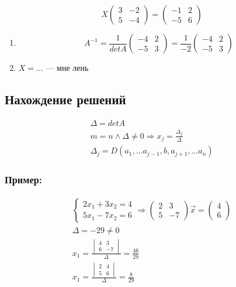 \documentclass{article}
\begin{document}
\[
X \begin{pmatrix}
	3 & -2 \\
	5 & -4
\end{pmatrix} =
\begin{pmatrix}
	-1 & 2 \\
	-5 & 6
\end{pmatrix}
\]

\begin{enumerate}
	\item \[
	A^{-1} = \frac{1}{det A} \begin{pmatrix}
		-4 & 2 \\
		-5 & 3
	\end{pmatrix} =
	\frac{1}{-2} \begin{pmatrix}
		-4 & 2 \\
		-5 & 3
	\end{pmatrix}
	\]
	\item $X = \dots$ --- мне лень
\end{enumerate}

\subsection{Нахождение решений}

\begin{gather*}
	\Delta = det A \\
	m = n \land \Delta \ne 0 \Rightarrow x_j = \frac{\Delta_j}{\Delta} \\
	\Delta_j = D(a_1, \dots a_{j-1}, b, a_{j+1}, \dots a_n)
\end{gather*}

\subsubsection*{Пример:}

\begin{gather*}
	\begin{cases}
		2x_1 + 3x_2 = 4 \\
		5x_1 - 7x_2 = 6
	\end{cases} \Rightarrow
	\begin{pmatrix}
		2 & 3 \\
		5 & -7
	\end{pmatrix} \vec{x} =
	\begin{pmatrix}
		4 \\
		6
	\end{pmatrix} \\
	\Delta = -29 \ne 0 \\
	x_1 = \frac{\begin{vmatrix}
		4 & 3 \\
		6 & -7
	\end{vmatrix}}{\Delta} = \frac{46}{29} \\
	x_1 = \frac{\begin{vmatrix}
		2 & 4 \\
		5 & 6
	\end{vmatrix}}{\Delta} = \frac{8}{29}
\end{gather*}
\end{document}
